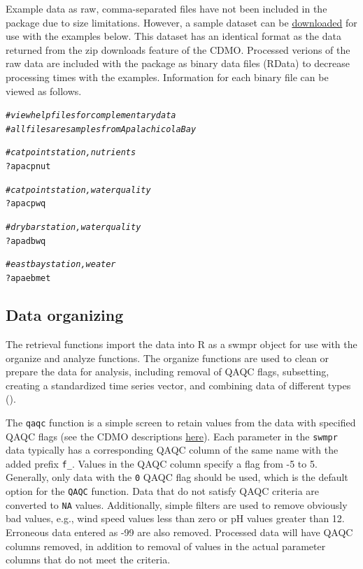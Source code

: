 \documentclass[10pt,letterpaper]{article}\usepackage[]{graphicx}\usepackage[]{color}
\makeatletter
\newcommand{\hlcom}[1]{\textcolor[rgb]{0.678,0.584,0.686}{\textit{#1}}}%
\newcommand{\hlopt}[1]{\textcolor[rgb]{0,0,0}{#1}}%
\newcommand{\hlstd}[1]{\textcolor[rgb]{0.345,0.345,0.345}{#1}}%
\newenvironment{kframe}{%
 \def\at@end@of@kframe{}%
 \ifinner\ifhmode%
  \def\at@end@of@kframe{\end{minipage}}%
  \begin{minipage}{\columnwidth}%
 \fi\fi%
 \def\FrameCommand##1{\hskip\@totalleftmargin \hskip-\fboxsep
 \colorbox{shadecolor}{##1}\hskip-\fboxsep
     \hskip-\linewidth \hskip-\@totalleftmargin \hskip\columnwidth}%
 \MakeFramed {\advance\hsize-\width
   \@totalleftmargin\z@ \linewidth\hsize
   \@setminipage}}%
 {\par\unskip\endMakeFramed%
 \at@end@of@kframe}
\newenvironment{knitrout}{}{} %
\makeatother
\begin{document}
Example data as raw, comma-separated files have not been included in the package due to size limitations.  However, a sample dataset can be \href{https://s3.amazonaws.com/swmpexdata/zip_ex.zip}{downloaded} for use with the examples below.  This dataset has an identical format as the data returned from the zip downloads feature of the \ac{CDMO}.  Processed verions of the raw data are included with the package as binary data files (RData) to decrease processing times with the examples.  Information for each binary file can be viewed as follows.

\begin{knitrout}
\color{fgcolor}\begin{kframe}
\begin{alltt}
\hlcom{# view help files for complementary data}
\hlcom{# all files are samples from Apalachicola Bay}

\hlcom{# cat point station, nutrients}
\hlopt{?}\hlstd{apacpnut}

\hlcom{# cat point station, water quality}
\hlopt{?}\hlstd{apacpwq}

\hlcom{# dry bar station, water quality}
\hlopt{?}\hlstd{apadbwq}

\hlcom{# east bay station, weater}
\hlopt{?}\hlstd{apaebmet}
\end{alltt}
\end{kframe}
\end{knitrout}

\subsection*{Data organizing}

The retrieval functions import the data into R as a swmpr object for use with the organize and analyze functions. The organize functions are used to clean or prepare the data for analysis, including removal of QAQC flags, subsetting, creating a standardized time series vector, and combining data of different types ().

The \texttt{qaqc} function is a simple screen to retain values from the data with specified QAQC flags (see the \ac{CDMO} descriptions \href{http://cdmo.baruch.sc.edu/data/qaqc.cfm}{here}).  Each parameter in the \texttt{swmpr} data typically has a corresponding QAQC column of the same name with the added prefix \texttt{f\_}.  Values in the QAQC column specify a flag from -5 to 5.  Generally, only data with the  \texttt{0} \ac{QAQC} flag should be used, which is the default option for the \texttt{QAQC} function.  Data that do not satisfy \ac{QAQC} criteria are converted to \texttt{NA} values.   Additionally, simple filters are used to remove obviously bad values, e.g., wind speed values less than zero or pH values greater than 12. Erroneous data entered as -99 are also removed. Processed data will have QAQC columns removed, in addition to removal of values in the actual parameter columns that do not meet the criteria. 
\end{document}
